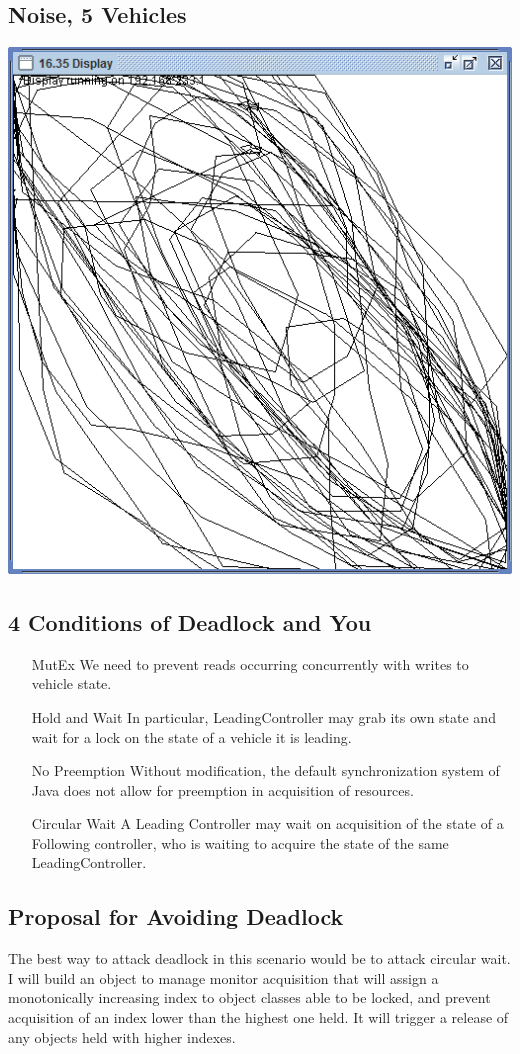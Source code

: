 \documentclass{article}
\begin{document}
\subsection{Noise, 5 Vehicles}

\begin{center}
\includegraphics[width=0.7\linewidth]{5noise}
\end{center}


\subsection{4 Conditions of Deadlock and You}

\begin{enumerate}
	\item[MutEx] We need to prevent reads occurring concurrently with writes to vehicle state.
	\item[Hold and Wait] In particular, LeadingController may grab its own state and wait for a lock on the state of a vehicle it is leading.
	\item[No Preemption]  Without modification, the default synchronization system of Java does not allow for preemption in acquisition of resources.
	\item[Circular Wait]  A Leading Controller may wait on acquisition of the state of a Following controller, who is waiting to acquire the state of the same LeadingController.
\end{enumerate}
\subsection{Proposal for Avoiding Deadlock} 

The best way to attack deadlock in this scenario would be to attack circular wait.  I will build an object to manage monitor acquisition that will assign a monotonically increasing index to object classes able to be locked, and prevent acquisition of an index lower than the highest one held.  It will trigger a release of any objects held with higher indexes.
\end{document}
